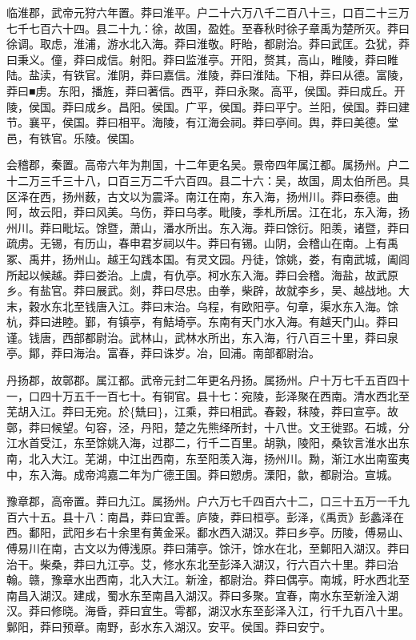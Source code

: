 \documentclass[]{article}
\begin{document}
临淮郡，武帝元狩六年置。莽曰淮平。户二十六万八千二百八十三，口百二十三万七千七百六十四。县二十九：徐，故国，盈姓。至春秋时徐子章禹为楚所灭。莽曰徐调。取虑，淮浦，游水北入海。莽曰淮敬。盱眙，都尉治。莽曰武匡。厹犹，莽曰秉义。僮，莽曰成信。射阳。莽曰监淮亭。开阳，赘其，高山，睢陵，莽曰睢陆。盐渎，有铁官。淮阴，莽曰嘉信。淮陵，莽曰淮陆。下相，莽曰从德。富陵，莽曰■虏。东阳，播旌，莽曰著信。西平，莽曰永聚。高平，侯国。莽曰成丘。开陵，侯国。莽曰成乡。昌阳。侯国。广平，侯国。莽曰平宁。兰阳，侯国。莽曰建节。襄平，侯国。莽曰相平。海陵，有江海会祠。莽曰亭间。舆，莽曰美德。堂邑，有铁官。乐陵。侯国。

会稽郡，秦置。高帝六年为荆国，十二年更名吴。景帝四年属江都。属扬州。户二十二万三千三十八，口百三万二千六百四。县二十六：吴，故国，周太伯所邑。具区泽在西，扬州薮，古文以为震泽。南江在南，东入海，扬州川。莽曰泰德。曲阿，故云阳，莽曰风美。乌伤，莽曰乌孝。毗陵，季札所居。江在北，东入海，扬州川。莽曰毗坛。馀暨，萧山，潘水所出。东入海。莽曰馀衍。阳羡，诸暨，莽曰疏虏。无锡，有历山，春申君岁祠以牛。莽曰有锡。山阴，会稽山在南。上有禹冢、禹井，扬州山。越王勾践本国。有灵文园。丹徒，馀姚，娄，有南武城，阖闾所起以候越。莽曰娄治。上虞，有仇亭。柯水东入海。莽曰会稽。海盐，故武原乡。有盐官。莽曰展武。剡，莽曰尽忠。由拳，柴辟，故就李乡，吴、越战地。大末，穀水东北至钱唐入江。莽曰末治。乌程，有欧阳亭。句章，渠水东入海。馀杭，莽曰进睦。鄞，有镇亭，有鮚埼亭。东南有天门水入海。有越天门山。莽曰谨。钱唐，西部都尉治。武林山，武林水所出，东入海，行八百三十里，莽曰泉亭。鄮，莽曰海治。富春，莽曰诛岁。冶，回浦。南部都尉治。

丹扬郡，故鄣郡。属江都。武帝元封二年更名丹扬。属扬州。户十万七千五百四十一，口四十万五千一百七十。有铜官。县十七：宛陵，彭泽聚在西南。清水西北至芜胡入江。莽曰无宛。於\{兟曰\}，江乘，莽曰相武。春穀，秣陵，莽曰宣亭。故鄣，莽曰候望。句容，泾，丹阳，楚之先熊绎所封，十八世。文王徙郢。石城，分江水首受江，东至馀姚入海，过郡二，行千二百里。胡孰，陵阳，桑钦言淮水出东南，北入大江。芜湖，中江出西南，东至阳羡入海，扬州川。黝，渐江水出南蛮夷中，东入海。成帝鸿嘉二年为广德王国。莽曰愬虏。溧阳，歙，都尉治。宣城。

豫章郡，高帝置。莽曰九江。属扬州。户六万七千四百六十二，口三十五万一千九百六十五。县十八：南昌，莽曰宜善。庐陵，莽曰桓亭。彭泽，《禹贡》彭蠡泽在西。鄱阳，武阳乡右十余里有黄金采。鄱水西入湖汉。莽曰乡亭。历陵，傅易山、傅易川在南，古文以为傅浅原。莽曰蒲亭。馀汗，馀水在北，至鄡阳入湖汉。莽曰治干。柴桑，莽曰九江亭。艾，修水东北至彭泽入湖汉，行六百六十里。莽曰治翰。赣，豫章水出西南，北入大江。新淦，都尉治。莽曰偶亭。南城，盱水西北至南昌入湖汉。建成，蜀水东至南昌入湖汉。莽曰多聚。宜春，南水东至新淦入湖汉。莽曰修晓。海昏，莽曰宜生。雩都，湖汉水东至彭泽入江，行千九百八十里。鄡阳，莽曰预章。南野，彭水东入湖汉。安平。侯国。莽曰安宁。
\end{document}
